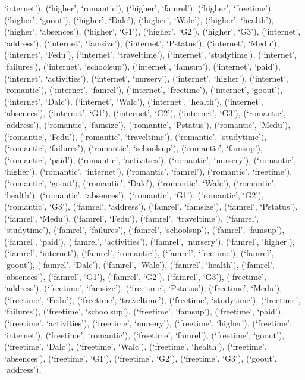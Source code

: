 \documentclass[
]{article}
\begin{document}
`internet'), (`higher', `romantic'), (`higher', `famrel'), (`higher',
`freetime'), (`higher', `goout'), (`higher', `Dalc'), (`higher',
`Walc'), (`higher', `health'), (`higher', `absences'), (`higher', `G1'),
(`higher', `G2'), (`higher', `G3'), (`internet', `address'),
(`internet', `famsize'), (`internet', `Pstatus'), (`internet', `Medu'),
(`internet', `Fedu'), (`internet', `traveltime'), (`internet',
`studytime'), (`internet', `failures'), (`internet', `schoolsup'),
(`internet', `famsup'), (`internet', `paid'), (`internet',
`activities'), (`internet', `nursery'), (`internet', `higher'),
(`internet', `romantic'), (`internet', `famrel'), (`internet',
`freetime'), (`internet', `goout'), (`internet', `Dalc'), (`internet',
`Walc'), (`internet', `health'), (`internet', `absences'), (`internet',
`G1'), (`internet', `G2'), (`internet', `G3'), (`romantic', `address'),
(`romantic', `famsize'), (`romantic', `Pstatus'), (`romantic', `Medu'),
(`romantic', `Fedu'), (`romantic', `traveltime'), (`romantic',
`studytime'), (`romantic', `failures'), (`romantic', `schoolsup'),
(`romantic', `famsup'), (`romantic', `paid'), (`romantic',
`activities'), (`romantic', `nursery'), (`romantic', `higher'),
(`romantic', `internet'), (`romantic', `famrel'), (`romantic',
`freetime'), (`romantic', `goout'), (`romantic', `Dalc'), (`romantic',
`Walc'), (`romantic', `health'), (`romantic', `absences'), (`romantic',
`G1'), (`romantic', `G2'), (`romantic', `G3'), (`famrel', `address'),
(`famrel', `famsize'), (`famrel', `Pstatus'), (`famrel', `Medu'),
(`famrel', `Fedu'), (`famrel', `traveltime'), (`famrel', `studytime'),
(`famrel', `failures'), (`famrel', `schoolsup'), (`famrel', `famsup'),
(`famrel', `paid'), (`famrel', `activities'), (`famrel', `nursery'),
(`famrel', `higher'), (`famrel', `internet'), (`famrel', `romantic'),
(`famrel', `freetime'), (`famrel', `goout'), (`famrel', `Dalc'),
(`famrel', `Walc'), (`famrel', `health'), (`famrel', `absences'),
(`famrel', `G1'), (`famrel', `G2'), (`famrel', `G3'), (`freetime',
`address'), (`freetime', `famsize'), (`freetime', `Pstatus'),
(`freetime', `Medu'), (`freetime', `Fedu'), (`freetime', `traveltime'),
(`freetime', `studytime'), (`freetime', `failures'), (`freetime',
`schoolsup'), (`freetime', `famsup'), (`freetime', `paid'), (`freetime',
`activities'), (`freetime', `nursery'), (`freetime', `higher'),
(`freetime', `internet'), (`freetime', `romantic'), (`freetime',
`famrel'), (`freetime', `goout'), (`freetime', `Dalc'), (`freetime',
`Walc'), (`freetime', `health'), (`freetime', `absences'), (`freetime',
`G1'), (`freetime', `G2'), (`freetime', `G3'), (`goout', `address'),
\end{document}
